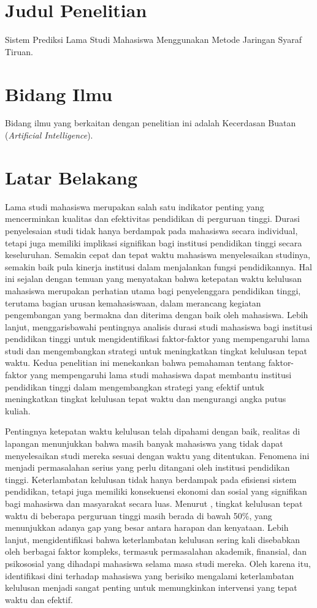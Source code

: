 \section{Judul Penelitian}
Sistem Prediksi Lama Studi Mahasiswa Menggunakan Metode Jaringan Syaraf Tiruan.

\section{Bidang Ilmu}
Bidang ilmu yang berkaitan dengan penelitian ini adalah Kecerdasan Buatan (\textit{Artificial Intelligence}).

\section{Latar Belakang}
Lama studi mahasiswa merupakan salah satu indikator penting yang mencerminkan kualitas dan efektivitas pendidikan di perguruan tinggi. Durasi penyelesaian studi tidak hanya berdampak pada mahasiswa secara individual, tetapi juga memiliki implikasi signifikan bagi institusi pendidikan tinggi secara keseluruhan. Semakin cepat dan tepat waktu mahasiswa menyelesaikan studinya, semakin baik pula kinerja institusi dalam menjalankan fungsi pendidikannya. Hal ini sejalan dengan temuan \cite{so2020developing} yang menyatakan bahwa ketepatan waktu kelulusan mahasiswa merupakan perhatian utama bagi penyelenggara pendidikan tinggi, terutama bagian urusan kemahasiswaan, dalam merancang kegiatan pengembangan yang bermakna dan diterima dengan baik oleh mahasiswa. Lebih lanjut, \cite{chen2019analysis} menggarisbawahi pentingnya analisis durasi studi mahasiswa bagi institusi pendidikan tinggi untuk mengidentifikasi faktor-faktor yang mempengaruhi lama studi dan mengembangkan strategi untuk meningkatkan tingkat kelulusan tepat waktu. Kedua penelitian ini menekankan bahwa pemahaman tentang faktor-faktor yang mempengaruhi lama studi mahasiswa dapat membantu institusi pendidikan tinggi dalam mengembangkan strategi yang efektif untuk meningkatkan tingkat kelulusan tepat waktu dan mengurangi angka putus kuliah.

Pentingnya ketepatan waktu kelulusan telah dipahami dengan baik, realitas di lapangan menunjukkan bahwa masih banyak mahasiswa yang tidak dapat menyelesaikan studi mereka sesuai dengan waktu yang ditentukan. Fenomena ini menjadi permasalahan serius yang perlu ditangani oleh institusi pendidikan tinggi. Keterlambatan kelulusan tidak hanya berdampak pada efisiensi sistem pendidikan, tetapi juga memiliki konsekuensi ekonomi dan sosial yang signifikan bagi mahasiswa dan masyarakat secara luas. Menurut \cite{putri2018analysis}, tingkat kelulusan tepat waktu di beberapa perguruan tinggi masih berada di bawah 50\%, yang menunjukkan adanya gap yang besar antara harapan dan kenyataan. Lebih lanjut, \cite{wang2018design} mengidentifikasi bahwa keterlambatan kelulusan sering kali disebabkan oleh berbagai faktor kompleks, termasuk permasalahan akademik, finansial, dan psikososial yang dihadapi mahasiswa selama masa studi mereka. Oleh karena itu, identifikasi dini terhadap mahasiswa yang berisiko mengalami keterlambatan kelulusan menjadi sangat penting untuk memungkinkan intervensi yang tepat waktu dan efektif.

